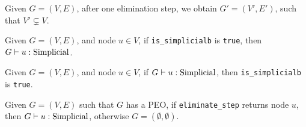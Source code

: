 
\begin{theorem}
    Given $G = (V, E)$, after one elimination step, we obtain $G'=(V', E')$, such that $V' \subsetneq V$. \Coqed
\end{theorem}

\pause

\begin{lemma}
    Given $G = (V, E)$, and node $u \in V$, if \texttt{is\_simplicialb} is \texttt{true}, then $\simplicial{u}{G}$. \Coqed
\end{lemma}

\pause

\begin{lemma}
    Given $G = (V, E)$, and node $u \in V$, if $\simplicial{u}{G}$, then \texttt{is\_simplicialb} is \texttt{true}. \Coqed
\end{lemma}

\pause

\begin{theorem}
    Given $G = (V, E)$ such that $G$ has a PEO, if \texttt{eliminate\_step} returns node $u$, then $\simplicial{u}{G}$, otherwise $G = (\emptyset, \emptyset)$. \Coqed
\end{theorem}




